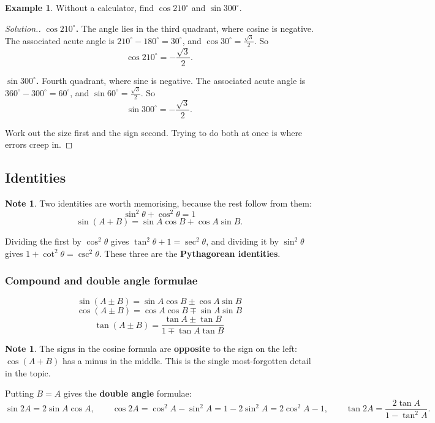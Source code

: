 \documentclass[11pt,a4paper]{article}
\theoremstyle{definition}
\newtheorem{example}[thm]{Example}
\newtheorem{note}[thm]{Note}
\newenvironment{solution}
  {\renewcommand{\qedsymbol}{}\begin{proof}[\textit{Solution}.]}
  {\end{proof}}
\begin{document}
\begin{example}
Without a calculator, find $\cos 210^\circ$ and $\sin 300^\circ$.
\end{example}

\begin{solution}
\textbf{$\cos 210^\circ$.} The angle lies in the third quadrant, where cosine is
negative. The associated acute angle is $210^\circ-180^\circ=30^\circ$, and
$\cos 30^\circ=\frac{\sqrt{3}}{2}$. So
$$\cos 210^\circ=-\frac{\sqrt{3}}{2}.$$

\textbf{$\sin 300^\circ$.} Fourth quadrant, where sine is negative. The associated
acute angle is $360^\circ-300^\circ=60^\circ$, and $\sin 60^\circ=\frac{\sqrt{3}}{2}$.
So
$$\sin 300^\circ=-\frac{\sqrt{3}}{2}.$$

Work out the size first and the sign second. Trying to do both at once is where errors
creep in.
\end{solution}

\subsection{Identities}

\begin{note}
Two identities are worth memorising, because the rest follow from them:
$$\sin^2\theta+\cos^2\theta=1$$
$$\sin(A+B)=\sin A\cos B+\cos A\sin B.$$
\end{note}

Dividing the first by $\cos^2\theta$ gives $\tan^2\theta+1=\sec^2\theta$, and dividing
it by $\sin^2\theta$ gives $1+\cot^2\theta=\csc^2\theta$. These three are the
\textbf{Pythagorean identities}.

\subsubsection{Compound and double angle formulae}

$$\sin(A\pm B)=\sin A\cos B\pm\cos A\sin B$$
$$\cos(A\pm B)=\cos A\cos B\mp\sin A\sin B$$
$$\tan(A\pm B)=\frac{\tan A\pm\tan B}{1\mp\tan A\tan B}$$

\begin{note}
The signs in the cosine formula are \textbf{opposite} to the sign on the left: $\cos(A+B)$
has a minus in the middle. This is the single most-forgotten detail in the topic.
\end{note}

Putting $B=A$ gives the \textbf{double angle} formulae:
$$\sin 2A=2\sin A\cos A,\qquad
\cos 2A=\cos^2A-\sin^2A=1-2\sin^2A=2\cos^2A-1,\qquad
\tan 2A=\frac{2\tan A}{1-\tan^2A}.$$
\end{document}
